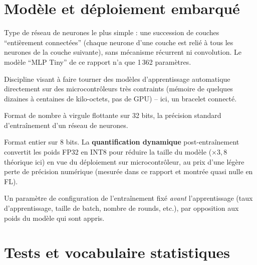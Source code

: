 \documentclass[11pt]{article}
\begin{document}
\section{Modèle et déploiement embarqué}

\begin{description}[leftmargin=0em, style=nextline]

\item[MLP (\textit{Multi-Layer Perceptron})] Type de réseau de neurones le plus simple :
une succession de couches ``entièrement connectées'' (chaque neurone d'une couche est
relié à tous les neurones de la couche suivante), sans mécanisme récurrent ni
convolution. Le modèle ``MLP Tiny'' de ce rapport n'a que 1\,362 paramètres.

\item[TinyML] Discipline visant à faire tourner des modèles d'apprentissage automatique
directement sur des microcontrôleurs très contraints (mémoire de quelques dizaines à
centaines de kilo-octets, pas de GPU) -- ici, un bracelet connecté.

\item[FP32] Format de nombre à virgule flottante sur 32 bits, la précision standard
d'entraînement d'un réseau de neurones.

\item[INT8] Format entier sur 8 bits. La \textbf{quantification dynamique} post-entraînement
convertit les poids FP32 en INT8 pour réduire la taille du modèle ($\times3{,}8$
théorique ici) en vue du déploiement sur microcontrôleur, au prix d'une légère perte de
précision numérique (mesurée dans ce rapport et montrée quasi nulle en FL).

\item[Hyperparamètre] Un paramètre de configuration de l'entraînement fixé \emph{avant}
l'apprentissage (taux d'apprentissage, taille de batch, nombre de rounds, etc.), par
opposition aux poids du modèle qui sont appris.

\end{description}

\section{Tests et vocabulaire statistiques}
\end{document}

